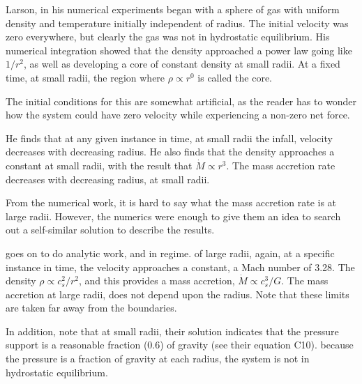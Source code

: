 \documentclass[../dissertation.tex]{subfiles}
\begin{document}
Larson, in his numerical experiments began with a sphere of gas with  uniform density and temperature initially independent of radius. 
The initial velocity was zero everywhere, but clearly the gas was not in hydrostatic equilibrium. His numerical integration showed that the density approached a power law going like $1/r^2$, as well as developing a core of constant density at small radii. At a fixed time, at small radii, the region where $\rho \propto r^0$ is called the core. 

The initial conditions for this are somewhat artificial, as the reader has to wonder how the system could have zero velocity while experiencing a non-zero net force.



He finds that at any given instance in time, at small radii the infall, velocity decreases with decreasing radius.
He also finds that the density approaches a constant at small radii, with the result that $\dot{M} \propto r^3 $. 
The mass accretion rate decreases with decreasing radius, at small radii.

From the numerical work, it is hard to say what the mass accretion rate is at large radii. 
However, the numerics were enough to give them an idea to search out a self-similar solution to describe the results.

\citet{1969MNRAS.145..271L} goes on to do analytic work, and in regime. 
of large radii, again, at a specific instance in time, the velocity approaches a constant, a Mach number of 3.28. 
The density $\rho \propto c_s^2 / r^2$, and this provides a mass accretion, $\dot{M} \propto c_s^3 / G$. 
The mass accretion at large radii, does not depend upon the radius. 
Note that these limits are taken far away from the boundaries.

In addition, \citet{1969MNRAS.145..271L} note that at small radii, their solution indicates that the pressure support is a reasonable fraction (0.6) of gravity (see their equation C10). 
because the  pressure is a fraction of gravity at each radius, the system is not in hydrostatic equilibrium.
\end{document}
